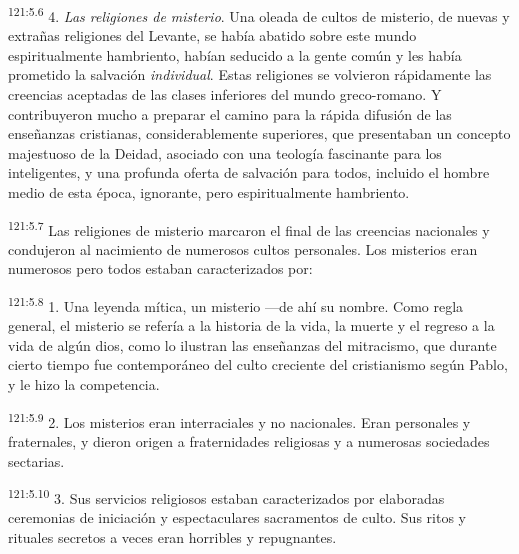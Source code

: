 \par
\textsuperscript{121:5.6} 4. \textit{Las religiones de misterio}. Una oleada de cultos de misterio, de nuevas y extrañas religiones del Levante, se había abatido sobre este mundo espiritualmente hambriento, habían seducido a la gente común y les había prometido la salvación \textit{individual}. Estas religiones se volvieron rápidamente las creencias aceptadas de las clases inferiores del mundo greco-romano. Y contribuyeron mucho a preparar el camino para la rápida difusión de las enseñanzas cristianas, considerablemente superiores, que presentaban un concepto majestuoso de la Deidad, asociado con una teología fascinante para los inteligentes, y una profunda oferta de salvación para todos, incluido el hombre medio de esta época, ignorante, pero espiritualmente hambriento.

\par
\textsuperscript{121:5.7} Las religiones de misterio marcaron el final de las creencias nacionales y condujeron al nacimiento de numerosos cultos personales. Los misterios eran numerosos pero todos estaban caracterizados por:

\par
\textsuperscript{121:5.8} 1. Una leyenda mítica, un misterio ---de ahí su nombre. Como regla general, el misterio se refería a la historia de la vida, la muerte y el regreso a la vida de algún dios, como lo ilustran las enseñanzas del mitracismo, que durante cierto tiempo fue contemporáneo del culto creciente del cristianismo según Pablo, y le hizo la competencia.

\par
\textsuperscript{121:5.9} 2. Los misterios eran interraciales y no nacionales. Eran personales y fraternales, y dieron origen a fraternidades religiosas y a numerosas sociedades sectarias.

\par
\textsuperscript{121:5.10} 3. Sus servicios religiosos estaban caracterizados por elaboradas ceremonias de iniciación y espectaculares sacramentos de culto. Sus ritos y rituales secretos a veces eran horribles y repugnantes.

